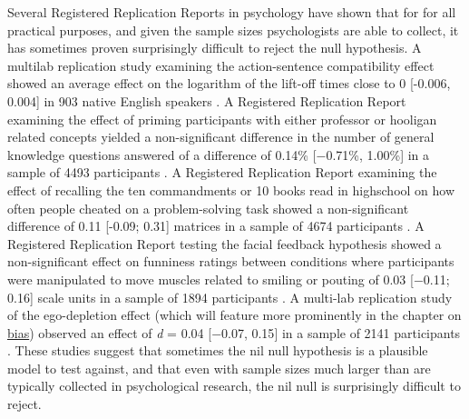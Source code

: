 \documentclass[
  oneside]{book}
\begin{document}
Several Registered Replication Reports in psychology have shown that for for all practical purposes, and given the sample sizes psychologists are able to collect, it has sometimes proven surprisingly difficult to reject the null hypothesis. A multilab replication study examining the action-sentence compatibility effect showed an average effect on the logarithm of the lift-off times close to 0 {[}-0.006, 0.004{]} in 903 native English speakers \citep{morey_pre-registered_2021}. A Registered Replication Report examining the effect of priming participants with either professor or hooligan related concepts yielded a non-significant difference in the number of general knowledge questions answered of a difference of 0.14\% {[}−0.71\%, 1.00\%{]} in a sample of 4493 participants \citep{odonnell_registered_2018}. A Registered Replication Report examining the effect of recalling the ten commandments or 10 books read in highschool on how often people cheated on a problem-solving task showed a non-significant difference of 0.11 {[}-0.09; 0.31{]} matrices in a sample of 4674 participants \citep{verschuere_registered_2018}. A Registered Replication Report testing the facial feedback hypothesis showed a non-significant effect on funniness ratings between conditions where participants were manipulated to move muscles related to smiling or pouting of 0.03 {[}−0.11; 0.16{]} scale units in a sample of 1894 participants \citep{wagenmakers_registered_2016}. A multi-lab replication study of the ego-depletion effect (which will feature more prominently in the chapter on \protect\hyperlink{bias}{bias}) observed an effect of \emph{d} = 0.04 {[}−0.07, 0.15{]} in a sample of 2141 participants \citep{hagger_multilab_2016}. These studies suggest that sometimes the nil null hypothesis is a plausible model to test against, and that even with sample sizes much larger than are typically collected in psychological research, the nil null is surprisingly difficult to reject.
\end{document}
